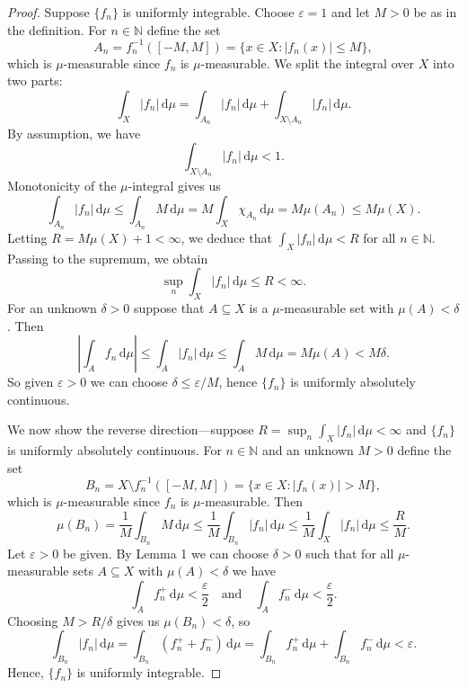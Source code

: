 \documentclass[12pt]{article}
\theoremstyle{definition}
\newcommand{\isp}[1]{\quad\text{#1}\quad}
\newcommand{\N}{\mathbb{N}}
\newcommand{\eps}{\varepsilon}
\newcommand{\<}{\langle}
\renewcommand{\>}{\rangle}
\newcommand{\dd}{\,\mathrm{d}}
\newcommand{\abs}[1]{\left|#1\right|}
\begin{document}
\begin{proof}
    Suppose $\{f_n\}$ is uniformly integrable.
    Choose $\eps = 1$ and let $M > 0$ be as in the definition.
    For $n \in \N$ define the set
    \[
        A_n = f_n^{-1}([-M, M]) = \{x \in X : |f_n(x)| \leq M\},
    \]
    which is $\mu$-measurable since $f_n$ is $\mu$-measurable.
    We split the integral over $X$ into two parts:
    \[
        \int_X |f_n| \dd\mu
            = \int_{A_n} |f_n| \dd\mu + \int_{X \setminus A_n} |f_n| \dd\mu.
    \]
    By assumption, we have
    \[
        \int_{X \setminus A_n} |f_n| \dd\mu < 1.
    \]
    Monotonicity of the $\mu$-integral gives us
    \[
        \int_{A_n} |f_n| \dd\mu
            \leq  \int_{A_n} M\dd\mu
            = M \int_X \chi_{A_n} \dd\mu
            = M \mu(A_n)
            \leq M \mu(X).
    \]
    Letting $R = M \mu(X) + 1 < \infty$, we deduce that $\int_X |f_n| \dd\mu < R$ for all $n \in \N$.
    Passing to the supremum, we obtain
    \[
        \sup_n \int_X |f_n| \dd\mu \leq R < \infty.
    \]
    For an unknown $\delta > 0$ suppose that $A \subseteq X$ is a $\mu$-measurable set with $\mu(A) < \delta$.
    Then
    \[
        \abs{\int_A f_n \dd\mu}
            \leq \int_A |f_n| \dd\mu
            \leq \int_A M\dd\mu
            = M \mu(A)
            < M \delta.
    \]
    So given $\eps > 0$ we can choose $\delta \leq \eps/M$, hence $\{f_n\}$ is uniformly absolutely continuous.

    We now show the reverse direction---suppose $R = \sup_n \int_X |f_n| \dd\mu < \infty$ and $\{f_n\}$ is uniformly absolutely continuous.
    For $n \in \N$ and an unknown $M > 0$ define the set
    \[
        B_n = X \setminus f_n^{-1}([-M, M]) = \{x \in X : |f_n(x)| > M\},
    \]
    which is $\mu$-measurable since $f_n$ is $\mu$-measurable.
    Then
    \[
        \mu(B_n)
            = \frac{1}{M} \int_{B_n} M \dd\mu
            \leq \frac{1}{M} \int_{B_n} |f_n| \dd\mu
            \leq \frac{1}{M} \int_X |f_n| \dd\mu
            \leq \frac{R}{M}.
    \]
    Let $\eps > 0$ be given.
    By Lemma 1 we can choose $\delta > 0$ such that for all $\mu$-measurable sets $A \subseteq X$ with $\mu(A) < \delta$ we have
    \[
        \int_A f_n^+ \dd\mu < \frac{\eps}{2}
        \isp{and}
        \int_A f_n^- \dd\mu < \frac{\eps}{2}.
    \]
    Choosing $M > R/\delta$ gives us $\mu(B_n) < \delta$, so
    \[
        \int_{B_n} |f_n| \dd\mu
            = \int_{B_n} (f_n^+ + f_n^-) \dd\mu
            = \int_{B_n} f_n^+ \dd\mu + \int_{B_n} f_n^- \dd\mu
            < \eps.
    \]
    Hence, $\{f_n\}$ is uniformly integrable.
\end{proof}
\end{document}
